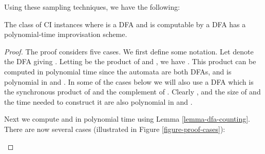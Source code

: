 \documentclass[a4paper,USenglish,numberwithinsect]{lipics}
\theoremstyle{plain}
\theoremstyle{definition}
\begin{document}
Using these sampling techniques, we have the following:

\begin{theorem} \label{theorem-dfa-scheme}
The class of CI instances  where  is
a DFA and  is computable by a DFA has a polynomial-time
improvisation scheme.  
\end{theorem}
\begin{proof}
The proof considers five cases. We first define some notation. 
Let  denote the DFA giving . Letting
 be the product of 
and , we have . This
product can be computed in polynomial time since the automata are both
DFAs, and  is polynomial in  and
. In some of the cases below we will also use a DFA
 which is the synchronous product of 
and the complement of . Clearly , and the size of  and the
time needed to construct it are also polynomial in  and
. 

Next we compute  and  in polynomial time using Lemma
\ref{lemma-dfa-counting}. There are now several cases (illustrated in Figure
\ref{figure-proof-cases}): 

{
\setlength{\intextsep}{8pt}
\setlength{\belowcaptionskip}{-5pt}
\setlength{\abovecaptionskip}{2pt}
\begin{figure}
\centering
{}
\end{figure}}
\end{proof}
\end{document}
